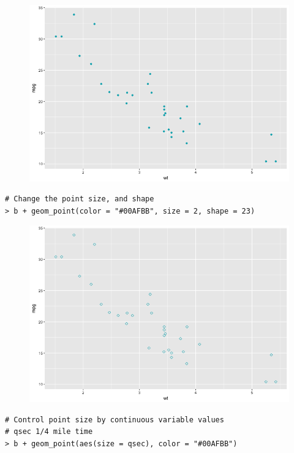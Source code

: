 \begin{figure}[H]\begin{center}\includegraphics[scale=1 ]{ilu/bg35.png}\end{center}\end{figure}
\begin{lstlisting}[language=html]
# Change the point size, and shape
> b + geom_point(color = "#00AFBB", size = 2, shape = 23)
\end{lstlisting}
\begin{figure}[H]\begin{center}\includegraphics[scale=1 ]{ilu/bg36.png}\end{center}\end{figure}
\begin{lstlisting}[language=html]
# Control point size by continuous variable values
# qsec 1/4 mile time
> b + geom_point(aes(size = qsec), color = "#00AFBB")
\end{lstlisting}
